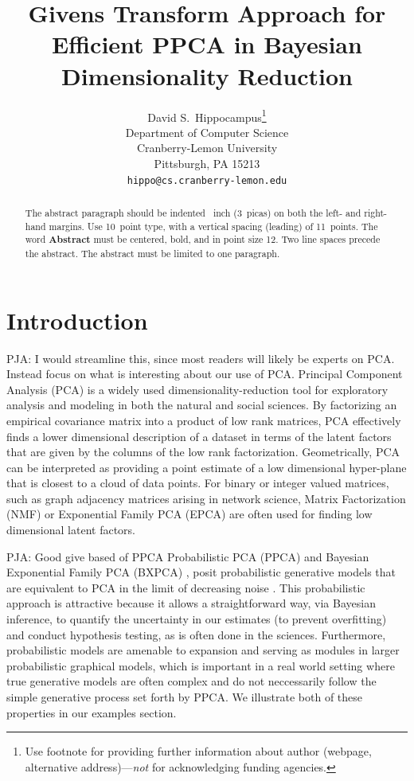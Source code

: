 \documentclass{article}
\title{Givens Transform Approach for Efficient PPCA in Bayesian Dimensionality Reduction}
\author{
  David S.~Hippocampus\thanks{Use footnote for providing further
    information about author (webpage, alternative
    address)---\emph{not} for acknowledging funding agencies.} \\
  Department of Computer Science\\
  Cranberry-Lemon University\\
  Pittsburgh, PA 15213 \\
  \texttt{hippo@cs.cranberry-lemon.edu} \\
}
\newcommand{\commentPJA}[1]{{\textcolor{commentPJA_color}{PJA: #1}}}
\begin{document}

\maketitle

\begin{abstract}
  The abstract paragraph should be indented ~inch
  (3~picas) on both the left- and right-hand margins. Use 10~point
  type, with a vertical spacing (leading) of 11~points.  The word
  \textbf{Abstract} must be centered, bold, and in point size 12. Two
  line spaces precede the abstract. The abstract must be limited to
  one paragraph.
\end{abstract}

\section{Introduction}

\commentPJA{I would streamline this, since most readers will likely be experts on PCA.  Instead focus on what is interesting about our use of PCA.}
Principal Component Analysis (PCA) is a widely used dimensionality-reduction tool for exploratory analysis and modeling in both the natural and social sciences. By factorizing an empirical covariance matrix into a product of low rank matrices, PCA effectively finds a lower dimensional description of a dataset in terms of the latent factors that are given by the columns of the low rank factorization. Geometrically, PCA can be interpreted as providing a point estimate of a low dimensional hyper-plane that is closest to a cloud of data points. For binary or integer valued matrices, such as graph adjacency matrices arising in network science, Matrix Factorization (NMF) \citep{lee2001algorithms} or Exponential Family PCA (EPCA) \citep{collins2001generalization} are often used for finding low dimensional latent factors.

\commentPJA{Good give based of PPCA}
Probabilistic PCA (PPCA) \citep{tipping1999probabilistic} and Bayesian Exponential Family PCA (BXPCA) \citep{mohamed2009bayesian}, posit probabilistic generative models that are equivalent to PCA in the limit of decreasing noise \citep[chapt.~12.2]{murphy2012machine}. This probabilistic approach is attractive because it allows a straightforward way, via Bayesian inference, to quantify the uncertainty in our estimates (to prevent overfitting) and conduct hypothesis testing, as is often done in the sciences. Furthermore, probabilistic models are amenable to expansion and serving as modules in larger probabilistic graphical models, which is important in a real world setting where true generative models are often complex and do not neccessarily follow the simple generative process set forth by PPCA. We illustrate both of these properties in our examples section.
\end{document}
